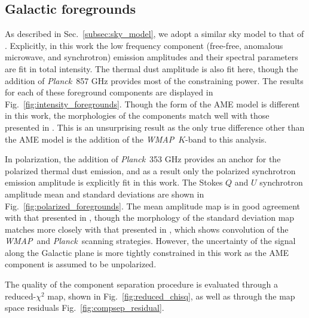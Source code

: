 \documentclass[twocolumn]{../../common/aa}
\def\WMAP{\emph{WMAP}}
\def\Planck{\emph{Planck}}
\begin{document}
\subsection{Galactic foregrounds}

As described in Sec.~\ref{subsec:sky_model}, we adopt a similar sky model to that of \cite{bp01}. Explicitly, in this work the low frequency component (free-free, anomalous microwave, and synchrotron) emission amplitudes and their spectral parameters are fit in total intensity. The thermal dust amplitude is also fit here, though the addition of \Planck\ 857 GHz provides most of the constraining power. The results for each of these foreground components are displayed in Fig.~\ref{fig:intensity_foregrounds}. Though the form of the AME model is different in this work, the morphologies of the components match well with those presented in \cite{bp13}. This is an unsurprising result as the only true difference other than the AME model is the addition of the \WMAP\ $K$-band to this analysis.

In polarization, the addition of \Planck\ 353 GHz provides an anchor for the polarized thermal dust emission, and as a result only the polarized synchrotron emission amplitude is explicitly fit in this work. The Stokes $Q$ and $U$ synchrotron amplitude mean and standard deviations are shown in Fig.~\ref{fig:polarized_foregrounds}. The mean amplitude map is in good agreement with that presented in \cite{bp14}, though the morphology of the standard deviation map matches more closely with that presented in \cite{bp15}, which shows convolution of the \WMAP\ and \Planck\ scanning strategies. However, the uncertainty of the signal along the Galactic plane is more tightly constrained in this work as the AME component is assumed to be unpolarized.

The quality of the component separation procedure is evaluated through a reduced-$\chi^2$   map, shown in Fig.~\ref{fig:reduced_chisq}, as well as through the map space residuals Fig.~\ref{fig:compsep_residual}.
\end{document}
